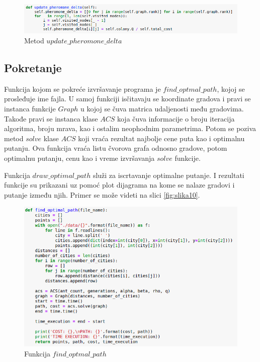 \documentclass[a4paper]{article}
\begin{document}
\begin{figure}[h!]
\begin{center}
\includegraphics[width=1\columnwidth]{slika7.png}
\end{center}
\caption{Metod $update\_pheromone\_delta$}
\label{fig:slika5}
\end{figure}

\newpage

\subsection{Pokretanje}
\label{pokretanje}

Funkcija kojom se pokreće izvršavanje programa je $find\_optmal\_path$, kojoj se prosleđuje ime fajla. U samoj funkciji isčitavaju se koordinate gradova i pravi se instanca funkcije $Graph$ u kojoj se 
čuva matrica udaljenosti među gradovima. Takođe pravi se instanca klase $ACS$ koja čuva informacije o broju iteracija algoritma, broju mrava, kao i ostalim neophodnim parametrima. Potom se poziva metod $solve$ klase $ACS$ koji vraća rezultat najbolje cene puta kao i optimalnu putanju. Ova funkcija vraća listu čvorova grafa odnosno gradove, potom optimalnu putanju, cenu kao i vreme izvršavanja $solve$ funkcije. 


Funkcija $draw\_optimal\_path$ služi za iscrtavanje optimalne putanje. I rezultati funkcije su prikazani uz pomoć plot dijagrama na kome se nalaze gradovi i putanje između njih. Primer se može videti na slici \ref{fig:slika10}.

\begin{figure}[h!]
\begin{center}
\includegraphics[width=1\columnwidth]{slika9.png}
\end{center}
\caption{Funkcija $find\_optmal\_path$}
\label{fig:slika5}
\end{figure}
\end{document}
